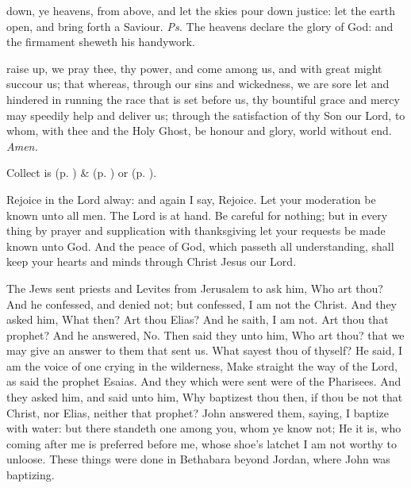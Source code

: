 
\introit
{} down, ye heavens, from above, and let the skies pour down justice: let the earth open, and bring forth a Saviour. \textit{Ps.} The heavens declare the glory of God: and the firmament sheweth his handywork.

\collect
{} raise up, we pray thee, thy power, and come among us, and with great might succour us; that whereas, through our sins and wickedness, we are sore let and hindered in running the race that is set before us, thy bountiful grace and mercy may speedily help and deliver us; through the satisfaction of thy Son our Lord, to whom, with thee and the Holy Ghost, be honour and glory, world without end. \textit{Amen.}
\begin{rubric}
     Collect is  (p. \pageref{SPMaryInAdvent}) \&   (p. \pageref{SPAgainst}) or  (p. \pageref{SPChiefBishop}).
\end{rubric}

 Rejoice in the Lord alway: and again I say, Rejoice. Let your moderation be known unto all men. The Lord is at hand. Be careful for nothing; but in every thing by prayer and supplication with thanksgiving let your requests be made known unto God. And the peace of God, which passeth all understanding, shall keep your hearts and minds through Christ Jesus our Lord.



 The Jews sent priests and Levites from Jerusalem to ask him, Who art thou? And he confessed, and denied not; but confessed, I am not the Christ. And they asked him, What then? Art thou Elias? And he saith, I am not. Art thou that prophet? And he answered, No. Then said they unto him, Who art thou? that we may give an answer to them that sent us. What sayest thou of thyself? He said, I am the voice of one crying in the wilderness, Make straight the way of the Lord, as said the prophet Esaias. And they which were sent were of the Pharisees. And they asked him, and said unto him, Why baptizest thou then, if thou be not that Christ, nor Elias, neither that prophet? John answered them, saying, I baptize with water: but there standeth one among you, whom ye know not; He it is, who coming after me is preferred before me, whose shoe's latchet I am not worthy to unloose. These things were done in Bethabara beyond Jordan, where John was baptizing.

